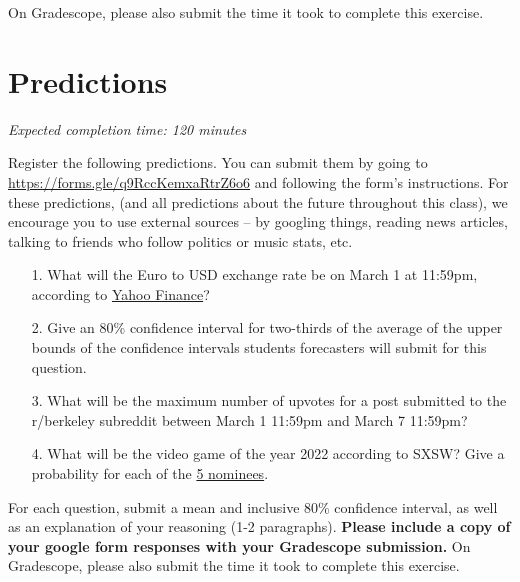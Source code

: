 \documentclass[11pt]{article}
\begin{document}
On Gradescope, please also submit the time it took to complete this exercise.

\section*{Predictions}

\emph{Expected completion time: 120 minutes}

Register the following predictions. You can submit them by going to \url{https://forms.gle/q9RccKemxaRtrZ6o6} and following the form's instructions. For these predictions, (and all predictions about the future throughout this class), we encourage you to use external sources -- by googling things, reading news articles, talking to friends who follow politics or music stats, etc.

\begin{enumerate}
	\item[1.] What will the Euro to USD exchange rate be on March 1 at 11:59pm, according to \href{https://finance.yahoo.com/quote/EURUSD=X/?}{Yahoo Finance}?
	
	\item[2.] Give an 80\% confidence interval for two-thirds of the average of the upper bounds of the confidence intervals students forecasters will submit for this question.
	
	\item[3.] What will be the maximum number of upvotes for a post submitted to the r/berkeley subreddit between March 1 11:59pm and March 7 11:59pm?
	
	\item[4.] What will be the video game of the year 2022 according to SXSW? Give a probability for each of the \href{https://www.sxsw.com/awards/gaming-awards/?}{5 nominees}.
\end{enumerate}

For each question, submit a mean and inclusive 80\% confidence interval, as well as an explanation of your reasoning (1-2 paragraphs). \textbf{Please include a copy of your google form responses with your Gradescope submission.} On Gradescope, please also submit the time it took to complete this exercise.
\end{document}
